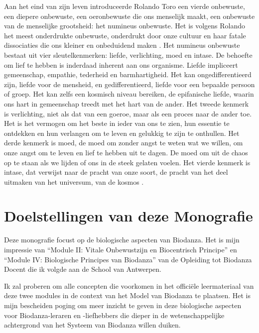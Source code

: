 \documentclass[
  11pt,
]{book}
\begin{document}
Aan het eind van zijn leven introduceerde Rolando Toro een vierde onbewuste, een diepere onbewuste, een oeronbewuste die ons menselijk maakt, een onbewuste van de menselijke grootsheid: het numineus onbewuste. Het is volgens Rolando het meest onderdrukte onbewuste, onderdrukt door onze cultuur en haar fatale dissociaties die ons kleiner en onbeduidend maken \citep{toro2009}.
Het numineus onbewuste bestaat uit vier sleutelkenmerken: liefde, verlichting, moed en intase. De behoefte om lief te hebben is inderdaad inherent aan ons organisme. Liefde impliceert gemeenschap, empathie, tederheid en barmhartigheid. Het kan ongedifferentieerd zijn, liefde voor de mensheid, en gedifferentieerd, liefde voor een bepaalde persoon of groep. Het kan zelfs een kosmisch niveau bereiken, de epifanische liefde, waarin ons hart in gemeenschap treedt met het hart van de ander. Het tweede kenmerk is verlichting, niet als dat van een goeroe, maar als een proces naar de ander toe. Het is het vermogen om het beste in ieder van ons te zien, hun essentie te ontdekken en hun verlangen om te leven en gelukkig te zijn te onthullen. Het derde kenmerk is moed, de moed om zonder angst te weten wat we willen, om onze angst om te leven en lief te hebben uit te dagen. De moed om uit de chaos op te staan als we lijden of ons in de steek gelaten voelen. Het vierde kenmerk is intase, dat verwijst naar de pracht van onze soort, de pracht van het deel uitmaken van het universum, van de kosmos \citep{toro2009}.
\newpage 

\hypertarget{doelstellingen-van-deze-monografie}{%
\section{Doelstellingen van deze Monografie}\label{doelstellingen-van-deze-monografie}}

Deze monografie focust op de biologische aspecten van Biodanza. Het is mijn impressie van ``Module II: Vitale Onbewustzijn en Biocentrisch Principe'' en ``Module IV: Biologische Principes van Biodanza'' van de Opleiding tot Biodanza Docent die ik volgde aan de School van Antwerpen.

Ik zal proberen om alle concepten die voorkomen in het officiële leermateriaal van deze twee modules in de context van het Model van Biodanza te plaatsen. Het is mijn bescheiden poging om meer inzicht te geven in deze biologische aspecten voor Biodanza-leraren en -liefhebbers die dieper in de wetenschappelijke achtergrond van het Systeem van Biodanza willen duiken.
\end{document}
